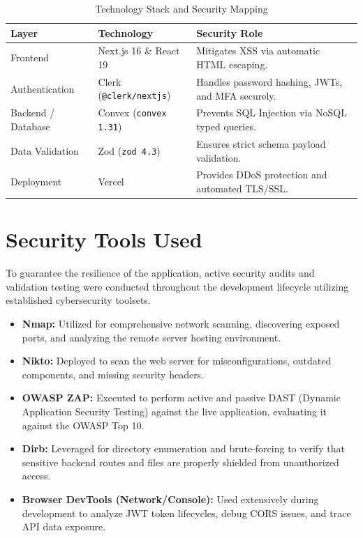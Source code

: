 \documentclass[12pt,a4paper]{report}
\begin{document}
\begin{table}[H]
    \centering
    \renewcommand{\arraystretch}{1.5}
    \begin{tabularx}{\textwidth}{|l|l|X|}
        \hline
        \textbf{Layer} & \textbf{Technology} & \textbf{Security Role} \\
        \hline
        Frontend & Next.js 16 \& React 19 & Mitigates XSS via automatic HTML escaping. \\
        \hline
        Authentication & Clerk (\texttt{@clerk/nextjs}) & Handles password hashing, JWTs, and MFA securely. \\
        \hline
        Backend / Database & Convex (\texttt{convex 1.31}) & Prevents SQL Injection via NoSQL typed queries. \\
        \hline
        Data Validation & Zod (\texttt{zod 4.3}) & Ensures strict schema payload validation. \\
        \hline
        Deployment & Vercel & Provides DDoS protection and automated TLS/SSL. \\
        \hline
    \end{tabularx}
    \caption{Technology Stack and Security Mapping}
    \label{tab:tech_stack}
\end{table}

\chapter{Security Tools Used}
To guarantee the resilience of the application, active security audits and validation testing were conducted throughout the development lifecycle utilizing established cybersecurity toolsets.

\begin{itemize}
    \item \textbf{Nmap:} Utilized for comprehensive network scanning, discovering exposed ports, and analyzing the remote server hosting environment.
    \item \textbf{Nikto:} Deployed to scan the web server for misconfigurations, outdated components, and missing security headers.
    \item \textbf{OWASP ZAP:} Executed to perform active and passive DAST (Dynamic Application Security Testing) against the live application, evaluating it against the OWASP Top 10.
    \item \textbf{Dirb:} Leveraged for directory enumeration and brute-forcing to verify that sensitive backend routes and files are properly shielded from unauthorized access.
    \item \textbf{Browser DevTools (Network/Console):} Used extensively during development to analyze JWT token lifecycles, debug CORS issues, and trace API data exposure.
\end{itemize}
\end{document}

